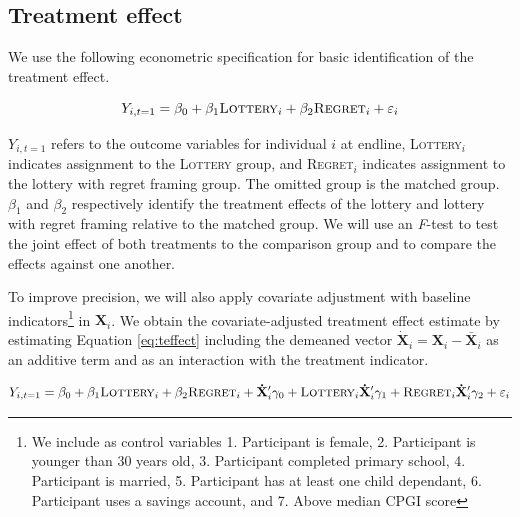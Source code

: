 \documentclass[12pt]{article}
\begin{document}
	\subsection{Treatment effect}

		We use the following econometric specification for basic identification of the treatment effect.

		\begin{equation} \label{eq:teffect}
			Y_{i,t=1} = \beta_{0} + \beta_{1}\text{\textsc{Lottery}}_{i} + \beta_{2}\text{\textsc{Regret}}_{i} + \varepsilon_{i}
		\end{equation}

		$Y_{i,t=1}$ refers to the outcome variables for individual $i$ at endline, \textsc{Lottery}$_i$ indicates assignment to the \textsc{Lottery} group, and \textsc{Regret}$_i$ indicates assignment to the lottery with regret framing group. The omitted group is the matched group. $\beta_{1}$ and $\beta_{2}$ respectively identify the treatment effects of the lottery and lottery with regret framing relative to the matched group. We will use an \emph{F}-test to test the joint effect of both treatments to the comparison group and to compare the effects against one another.

		To improve precision, we will also apply covariate adjustment with baseline indicators\footnote{We include as control variables 1. Participant is female, 2. Participant is younger than 30 years old, 3. Participant completed primary school, 4. Participant is married, 5. Participant has at least one child dependant, 6. Participant uses a savings account, and 7. Above median CPGI score} in $\mathbf{X}_i$. We obtain the covariate-adjusted treatment effect estimate by estimating Equation \ref{eq:teffect} including the demeaned vector $\mathbf{\dot X}_{i} = \mathbf{X}_{i} - \mathbf{\bar X}_{i}$ as an additive term and as an interaction with the treatment indicator.

		\begin{equation} \label{eq:controls}
			Y_{i,t=1} = \beta_{0} + \beta_{1}\text{\textsc{Lottery}}_{i} + \beta_{2}\text{\textsc{Regret}}_{i} + \mathbf{\dot X}'_i \gamma_{0} + \text{\textsc{Lottery}}_{i} \mathbf{\dot X}'_i \gamma_{1} + \text{\textsc{Regret}}_{i} \mathbf{\dot X}'_i \gamma_{2} + \varepsilon_{i}
		\end{equation}

\end{document}
